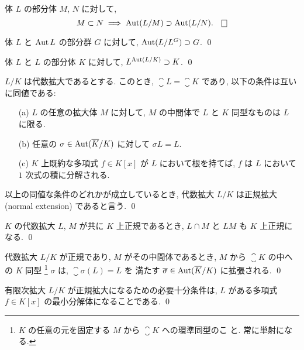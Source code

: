 \documentclass[12pt,twoside]{jarticle}
\begin{document}
\begin{question}
  体 $L$ の部分体 $M$, $N$ に対して,
  \begin{equation*}
    M\subset N \implies \Aut(L/M) \supset \Aut(L/N). \qed
  \end{equation*}
\end{question}

\begin{question}
  体 $L$ と $\mathop{\mathrm{Aut}}\nolimits L$ の部分群 $G$ に対して, $\mathop{\mathrm{Aut}}\nolimits(L/L^G)\supset G$. \qed
\end{question}

\begin{question}
  体 $L$ と $L$ の部分体 $K$ に対して, $L^{\mathop{\mathrm{Aut}}\nolimits(L/K)} \supset K$. \qed
\end{question}

\begin{question}[正規拡大]
  $L/K$ は代数拡大であるとする. このとき, $\closure{L}=\closure{K}$ であり, 
  以下の条件は互いに同値である:
  \begin{itemize}
  \item[(a)] $L$ の任意の拡大体 $M$ に対して,
    $M$ の中間体で $L$ と $K$ 同型なものは $L$ に限る.
  \item[(b)] 任意の $\sigma\in\mathop{\mathrm{Aut}}\nolimits(\overline{K}/K)$ に対して $\sigma{L} = L$.
  \item[(c)] $K$ 上既約な多項式 $f\in K[x]$ が $L$ において根を持てば,
    $f$ は $L$ において $1$ 次式の積に分解される. 
  \end{itemize}
  以上の同値な条件のどれかが成立しているとき, 代数拡大 $L/K$ は正規拡大
  (normal extension) であると言う.
  \qed
\end{question}

\begin{question}
  $K$ の代数拡大 $L$, $M$ が共に $K$ 上正規であるとき,
  $L\cap M$ と $LM$ も $K$ 上正規になる.  \qed
\end{question}

\begin{question}
  代数拡大 $L/K$ が正規であり, $M$ がその中間体であるとき,
  $M$ から $\closure{K}$ の中への $K$ 同型%
  \footnote{$K$ の任意の元を固定する $M$ から $\closure{K}$ への環準同型のこ
    と. 常に単射になる.} %
  $\sigma$ は, $\closure{\sigma}(L)=L$ を
  満たす $\overline{\sigma}\in\mathop{\mathrm{Aut}}\nolimits(\overline{K}/K)$ に拡張される. \qed
\end{question}

\begin{question}
  有限次拡大 $L/K$ が正規拡大になるための必要十分条件は,
  $L$ がある多項式 $f\in K[x]$ の最小分解体になることである. \qed
\end{question}
\end{document}
